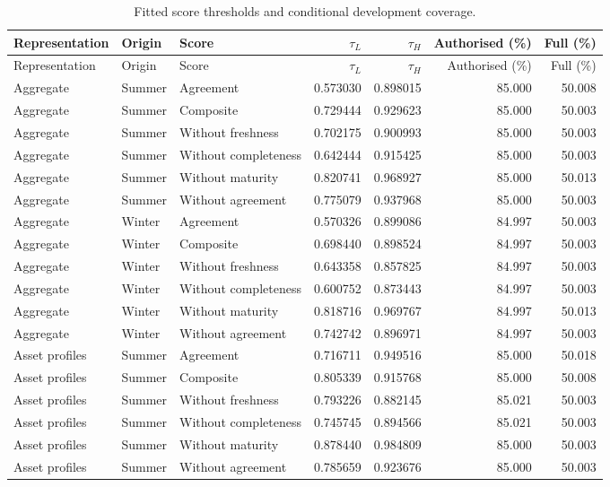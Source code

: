 \documentclass[11pt]{article}
\begin{document}
\small\begin{longtable}{lllrrrr}
\caption{Fitted score thresholds and conditional development coverage.}\\\toprule
Representation & Origin & Score & $\tau_L$ & $\tau_H$ & Authorised (\%) & Full (\%)\\\midrule
\endfirsthead
\toprule
Representation & Origin & Score & $\tau_L$ & $\tau_H$ & Authorised (\%) & Full (\%)\\\midrule
\endhead
\bottomrule\endfoot
Aggregate & Summer & Agreement & 0.573030 & 0.898015 & 85.000 & 50.008\\
Aggregate & Summer & Composite & 0.729444 & 0.929623 & 85.000 & 50.003\\
Aggregate & Summer & Without freshness & 0.702175 & 0.900993 & 85.000 & 50.003\\
Aggregate & Summer & Without completeness & 0.642444 & 0.915425 & 85.000 & 50.003\\
Aggregate & Summer & Without maturity & 0.820741 & 0.968927 & 85.000 & 50.013\\
Aggregate & Summer & Without agreement & 0.775079 & 0.937968 & 85.000 & 50.003\\
Aggregate & Winter & Agreement & 0.570326 & 0.899086 & 84.997 & 50.003\\
Aggregate & Winter & Composite & 0.698440 & 0.898524 & 84.997 & 50.003\\
Aggregate & Winter & Without freshness & 0.643358 & 0.857825 & 84.997 & 50.003\\
Aggregate & Winter & Without completeness & 0.600752 & 0.873443 & 84.997 & 50.003\\
Aggregate & Winter & Without maturity & 0.818716 & 0.969767 & 84.997 & 50.013\\
Aggregate & Winter & Without agreement & 0.742742 & 0.896971 & 84.997 & 50.003\\
Asset profiles & Summer & Agreement & 0.716711 & 0.949516 & 85.000 & 50.018\\
Asset profiles & Summer & Composite & 0.805339 & 0.915768 & 85.000 & 50.008\\
Asset profiles & Summer & Without freshness & 0.793226 & 0.882145 & 85.021 & 50.003\\
Asset profiles & Summer & Without completeness & 0.745745 & 0.894566 & 85.021 & 50.003\\
Asset profiles & Summer & Without maturity & 0.878440 & 0.984809 & 85.000 & 50.003\\
Asset profiles & Summer & Without agreement & 0.785659 & 0.923676 & 85.000 & 50.003\\

\end{longtable}
\end{document}
